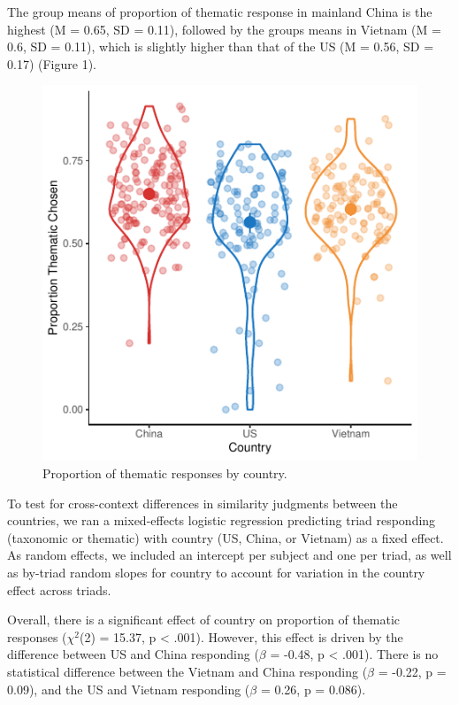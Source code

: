 \documentclass[10pt, letterpaper]{article}
\newenvironment{CodeChunk}{}{}
\begin{document}
The group means of proportion of thematic response in mainland China is
the highest (M = 0.65, SD = 0.11), followed by the groups means in
Vietnam (M = 0.6, SD = 0.11), which is slightly higher than that of the
US (M = 0.56, SD = 0.17) (Figure 1).

\begin{CodeChunk}
\begin{figure}[tb]

{\centering \includegraphics{figs/unnamed-chunk-1-1} 

}

\caption[Proportion of thematic responses by country]{Proportion of thematic responses by country.}\label{fig:unnamed-chunk-1}
\end{figure}
\end{CodeChunk}

To test for cross-context differences in similarity judgments between
the countries, we ran a mixed-effects logistic regression predicting
triad responding (taxonomic or thematic) with country (US, China, or
Vietnam) as a fixed effect. As random effects, we included an intercept
per subject and one per triad, as well as by-triad random slopes for
country to account for variation in the country effect across triads.

Overall, there is a significant effect of country on proportion of
thematic responses (\(\chi^2\)(2) = 15.37, p \textless{} .001). However,
this effect is driven by the difference between US and China responding
(\(\beta\) = -0.48, p \textless{} .001). There is no statistical
difference between the Vietnam and China responding (\(\beta\) = -0.22,
p = 0.09), and the US and Vietnam responding (\(\beta\) = 0.26, p =
0.086).
\end{document}
